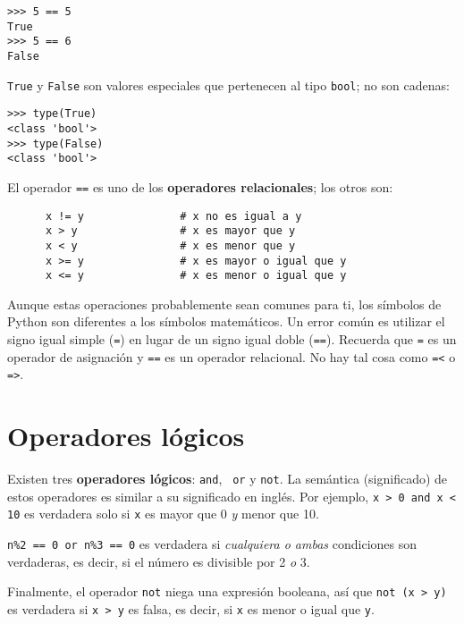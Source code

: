 \documentclass[10pt]{book}
\begin{document}
\begin{verbatim}
>>> 5 == 5
True
>>> 5 == 6
False
\end{verbatim}
%
{\tt True} y {\tt False} son valores
especiales que pertenecen al tipo {\tt bool}; no son cadenas:

\begin{verbatim}
>>> type(True)
<class 'bool'>
>>> type(False)
<class 'bool'>
\end{verbatim}
%
El operador {\tt ==} es uno de los {\bf operadores relacionales}; los
otros son:

\begin{verbatim}
      x != y               # x no es igual a y
      x > y                # x es mayor que y
      x < y                # x es menor que y
      x >= y               # x es mayor o igual que y
      x <= y               # x es menor o igual que y
\end{verbatim}
%
Aunque estas operaciones probablemente sean comunes para ti, los símbolos de Python
son diferentes a los símbolos matemáticos.  Un error común
es utilizar el signo igual simple ({\tt =}) en lugar de un signo igual doble
({\tt ==}).  Recuerda que {\tt =} es un operador de asignación y
{\tt ==} es un operador relacional.   No hay tal cosa como
{\tt =<} o {\tt =>}.


\section {Operadores lógicos}

Existen tres {\bf operadores lógicos}: {\tt and}, {\tt
or} y {\tt not}.  La semántica (significado) de estos operadores es
similar a su significado en inglés.  Por ejemplo,
{\tt x > 0 and x < 10} es verdadera solo si {\tt x} es mayor que 0
{\em y} menor que 10.

{\tt n\%2 == 0 or n\%3 == 0} es verdadera si {\em cualquiera o ambas}
condiciones son verdaderas, es decir, si el número es divisible por 2 {\em o}
3.

Finalmente, el operador {\tt not} niega una expresión
booleana, así que {\tt not (x > y)} es verdadera si {\tt x > y} es falsa,
es decir, si {\tt x} es menor o igual que {\tt y}.
\end{document}
